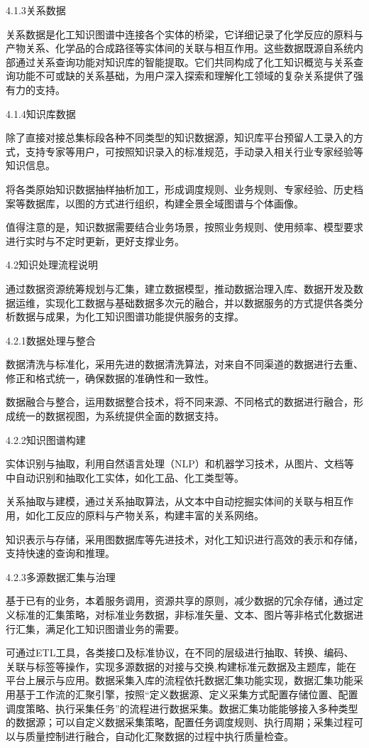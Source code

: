 4.1.3关系数据

关系数据是化工知识图谱中连接各个实体的桥梁，它详细记录了化学反应的原料与产物关系、化学品的合成路径等实体间的关联与相互作用。这些数据既源自系统内部通过关系查询功能对知识库的智能提取。它们共同构成了化工知识概览与关系查询功能不可或缺的关系基础，为用户深入探索和理解化工领域的复杂关系提供了强有力的支持。

4.1.4知识库数据

除了直接对接总集标段各种不同类型的知识数据源，知识库平台预留人工录入的方式，支持专家等用户，可按照知识录入的标准规范，手动录入相关行业专家经验等知识信息。

将各类原始知识数据抽样抽析加工，形成调度规则、业务规则、专家经验、历史档案等数据库，以图的方式进行组织，构建全景全域图谱与个体画像。

值得注意的是，知识数据需要结合业务场景，按照业务规则、使用频率、模型要求进行实时与不定时更新，更好支撑业务。

4.2知识处理流程说明

通过数据资源统筹规划与汇集，建立数据模型，推动数据治理入库、数据开发及数据运维，实现化工数据与基础数据多次元的融合，并以数据服务的方式提供各类分析数据与成果，为化工知识图谱功能提供服务的支撑。

4.2.1数据处理与整合

数据清洗与标准化，采用先进的数据清洗算法，对来自不同渠道的数据进行去重、修正和格式统一，确保数据的准确性和一致性。

数据融合与整合，运用数据整合技术，将不同来源、不同格式的数据进行融合，形成统一的数据视图，为系统提供全面的数据支持。

4.2.2知识图谱构建

实体识别与抽取，利用自然语言处理（NLP）和机器学习技术，从图片、文档等中自动识别和抽取化工实体，如化工品、化工类型等。

关系抽取与建模，通过关系抽取算法，从文本中自动挖掘实体间的关联与相互作用，如化工反应的原料与产物关系，构建丰富的关系网络。

知识表示与存储，采用图数据库等先进技术，对化工知识进行高效的表示和存储，支持快速的查询和推理。

4.2.3多源数据汇集与治理

基于已有的业务，本着服务调用，资源共享的原则，减少数据的冗余存储，通过定义标准的汇集策略，对标准业务数据，非标准矢量、文本、图片等非格式化数据进行汇集，满足化工知识图谱业务的需要。

可通过ETL工具，各类接口及标准协议，在不同的层级进行抽取、转换、编码、关联与标签等操作，实现多源数据的对接与交换,构建标准元数据及主题库，能在平台上展示与应用。数据采集入库的流程依托数据汇集功能实现，数据汇集功能采用基于工作流的汇聚引擎，按照“定义数据源、定义采集方式配置存储位置、配置调度策略、执行采集任务”的流程进行数据采集。数据汇集功能能够接入多种类型的数据源；可以自定义数据采集策略，配置任务调度规则、执行周期；采集过程可以与质量控制进行融合，自动化汇聚数据的过程中执行质量检查。

